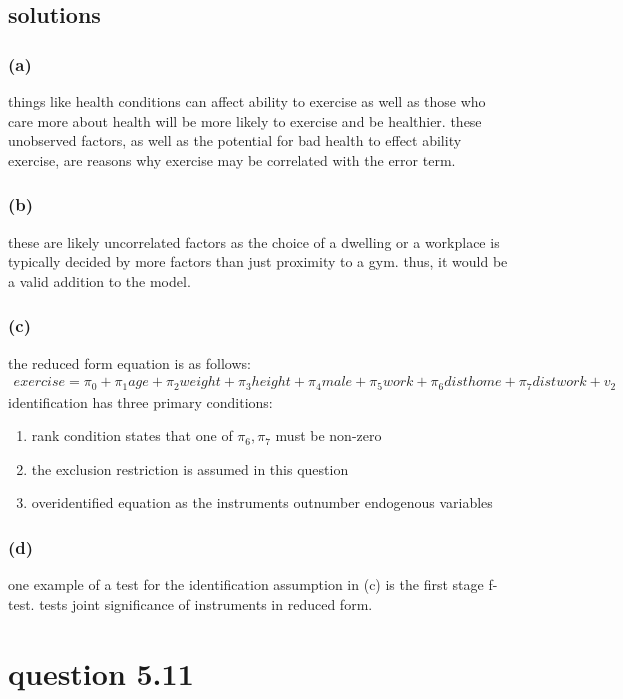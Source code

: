 \documentclass[10pt, a4paper]{article}
\begin{document}
    \subsection*{solutions}
      \subsubsection*{(a)}
        things like health conditions can affect ability to exercise as well as those who care more about health will be more likely to exercise and be healthier. these unobserved factors, as well as the potential for bad health to effect ability exercise, are reasons why exercise may be correlated with the error term.
      \subsubsection*{(b)}
        these are likely uncorrelated factors as the choice of a dwelling or a workplace is typically decided by more factors than just proximity to a gym. thus, it would be a valid addition to the model.
      \subsubsection*{(c)}
        the reduced form equation is as follows:
        \begin{gather*}
          exercise = \pi_0 + \pi_1age + \pi_2weight + \pi_3height + \pi_4male + \pi_5work + \pi_6disthome + \pi_7distwork + v_2
        \end{gather*}
        identification has three primary conditions:
        \begin{enumerate}
          \item rank condition states that one of $\pi_6,\pi_7$ must be non-zero \\
          \item the exclusion restriction is assumed in this question \\
          \item overidentified equation as the instruments outnumber endogenous variables
        \end{enumerate}
      \subsubsection*{(d)}
        one example of a test for the identification assumption in (c) is the first stage f-test. tests joint significance of instruments in reduced form.
  \section*{question 5.11}
\end{document}
